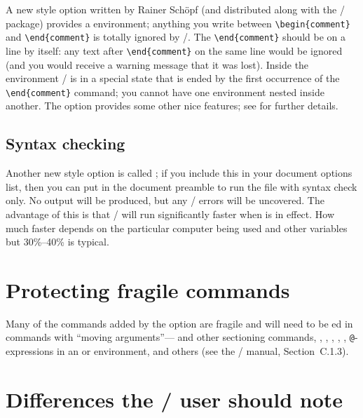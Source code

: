 A new  style option written by Rainer Sch\"opf (and
distributed along with the \amslatex/ package) provides a 
environment;
anything you write between \verb"\begin{comment}" and
\verb"\end{"\verb"comment}" is totally ignored by \latex/\@.  The
\verb"\end{"\verb"comment}" should be on a line by itself: any text
after \verb"\end{"\verb"comment}" on the same line would be ignored (and
you would receive a warning message that it was lost).  Inside the
 environment \latex/ is in a special state that is
ended by the first occurrence of the \verb"\end{"\verb"comment}"
command; you cannot have one  environment nested inside
another.  The  option provides some
other nice features; see  for further details.

\subsection{Syntax checking}

Another new style option is called ; if you include this
in your document options list, then you can put  in the
document preamble to run the file with syntax check only.  No output
will be produced, but any \latex/ errors will be uncovered.  The
advantage of this is that \latex/ will run significantly faster when
 is in effect.  How much faster depends on the particular
computer being used and other variables but 30\%--40\% is typical.

\section{Protecting fragile commands}

Many of the commands added by the  option are fragile and
will need to be ed in commands with ``moving
arguments''--- and other sectioning commands, ,
, , , ,
\verb"@"-expressions in an  or  environment, and
others (see the \latex/ manual, Section~C.1.3).
\sloppypar

\section{Differences the \latex/ user should note}

